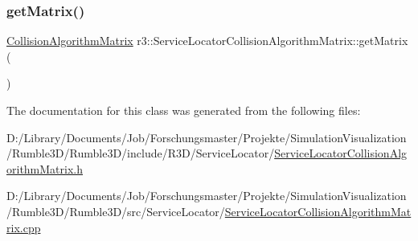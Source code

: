 \subsubsection{\texorpdfstring{get\+Matrix()}{getMatrix()}}
{\footnotesize\ttfamily \mbox{\hyperlink{classr3_1_1_collision_algorithm_matrix}{Collision\+Algorithm\+Matrix}} r3\+::\+Service\+Locator\+Collision\+Algorithm\+Matrix\+::get\+Matrix (\begin{DoxyParamCaption}{ }\end{DoxyParamCaption})\hspace{0.3cm}{\ttfamily [static]}}



The documentation for this class was generated from the following files\+:\begin{DoxyCompactItemize}
\item 
D\+:/\+Library/\+Documents/\+Job/\+Forschungsmaster/\+Projekte/\+Simulation\+Visualization/\+Rumble3\+D/\+Rumble3\+D/include/\+R3\+D/\+Service\+Locator/\mbox{\hyperlink{_service_locator_collision_algorithm_matrix_8h}{Service\+Locator\+Collision\+Algorithm\+Matrix.\+h}}\item 
D\+:/\+Library/\+Documents/\+Job/\+Forschungsmaster/\+Projekte/\+Simulation\+Visualization/\+Rumble3\+D/\+Rumble3\+D/src/\+Service\+Locator/\mbox{\hyperlink{_service_locator_collision_algorithm_matrix_8cpp}{Service\+Locator\+Collision\+Algorithm\+Matrix.\+cpp}}\end{DoxyCompactItemize}
